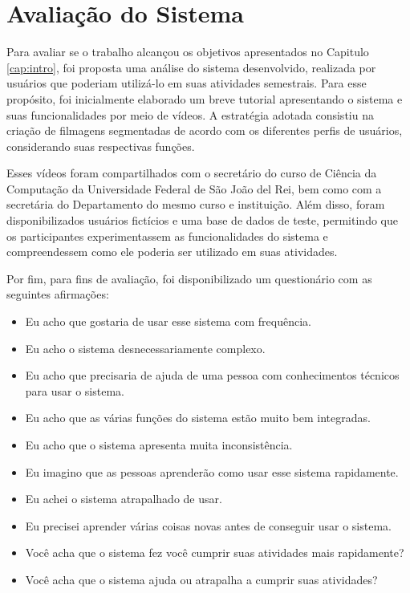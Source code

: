 



\newpage
\section{Avaliação do Sistema}\label{ref:avaliação}

Para avaliar se o trabalho alcançou os objetivos apresentados no Capitulo \ref{cap:intro}, foi proposta uma análise do sistema desenvolvido, realizada por usuários que poderiam utilizá-lo em suas atividades semestrais. Para esse propósito, foi inicialmente elaborado um breve tutorial apresentando o sistema e suas funcionalidades por meio de vídeos. A estratégia adotada consistiu na criação de filmagens segmentadas de acordo com os diferentes perfis de usuários, considerando suas respectivas funções.

Esses vídeos foram compartilhados com o secretário do curso de Ciência da Computação da Universidade Federal de São João del Rei, bem como com a secretária do Departamento do mesmo curso e instituição. Além disso, foram disponibilizados usuários fictícios e uma base de dados de teste, permitindo que os participantes experimentassem as funcionalidades do sistema e compreendessem como ele poderia ser utilizado em suas atividades.

Por fim, para fins de avaliação, foi disponibilizado um questionário com as seguintes afirmações:

\begin{itemize}
    \item Eu acho que gostaria de usar esse sistema com frequência.
    \item Eu acho o sistema desnecessariamente complexo.
    \item Eu acho que precisaria de ajuda de uma pessoa com conhecimentos técnicos para usar o sistema.
    \item Eu acho que as várias funções do sistema estão muito bem integradas.
    \item Eu acho que o sistema apresenta muita inconsistência.
    \item Eu imagino que as pessoas aprenderão como usar esse sistema rapidamente.
    \item Eu achei o sistema atrapalhado de usar.
    \item Eu precisei aprender várias coisas novas antes de conseguir usar o sistema.
    \item Você acha que o sistema fez você cumprir suas atividades mais rapidamente?
    \item Você acha que o sistema ajuda ou atrapalha a cumprir suas atividades?
\end{itemize}

